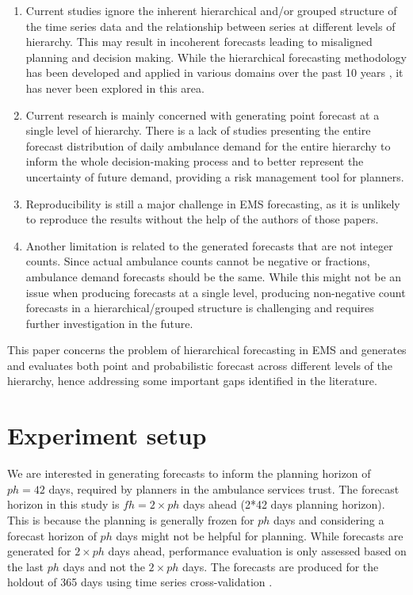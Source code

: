 \documentclass[
  authoryear,
  preprint,
  3p]{elsarticle}
\begin{document}
\begin{enumerate}
\def\labelenumi{\arabic{enumi}.}
\item
  Current studies ignore the inherent hierarchical and/or grouped
  structure of the time series data and the relationship between series
  at different levels of hierarchy. This may result in incoherent
  forecasts leading to misaligned planning and decision making. While
  the hierarchical forecasting methodology has been developed and
  applied in various domains over the past 10 years
  \citep{panagiotelis2022probabilistic}, it has never been explored in
  this area.
\item
  Current research is mainly concerned with generating point forecast at
  a single level of hierarchy. There is a lack of studies presenting the
  entire forecast distribution of daily ambulance demand for the entire
  hierarchy to inform the whole decision-making process and to better
  represent the uncertainty of future demand, providing a risk
  management tool for planners.
\item
  Reproducibility is still a major challenge in EMS forecasting, as it
  is unlikely to reproduce the results without the help of the authors
  of those papers.
\item
  Another limitation is related to the generated forecasts that are not
  integer counts. Since actual ambulance counts cannot be negative or
  fractions, ambulance demand forecasts should be the same. While this
  might not be an issue when producing forecasts at a single level,
  producing non-negative count forecasts in a hierarchical/grouped
  structure is challenging and requires further investigation in the
  future.
\end{enumerate}

This paper concerns the problem of hierarchical forecasting in EMS and
generates and evaluates both point and probabilistic forecast across
different levels of the hierarchy, hence addressing some important gaps
identified in the literature.

\hypertarget{sec-experiment}{%
\section{Experiment setup}\label{sec-experiment}}

We are interested in generating forecasts to inform the planning horizon
of \(ph= 42\) days, required by planners in the ambulance services
trust. The forecast horizon in this study is \(fh = 2 \times ph\) days
ahead (2*42 days planning horizon). This is because the planning is
generally frozen for \(ph\) days and considering a forecast horizon of
\(ph\) days might not be helpful for planning. While forecasts are
generated for \(2 \times ph\) days ahead, performance evaluation is only
assessed based on the last \(ph\) days and not the \(2 \times ph\) days.
The forecasts are produced for the holdout of 365 days using time series
cross-validation \citep{hyndman2021forecasting}.
\end{document}
